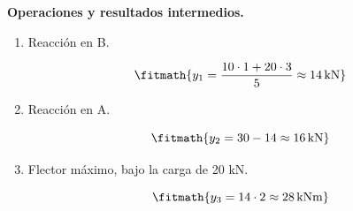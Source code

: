 \noindent\textbf{Operaciones y resultados intermedios.}

\begin{enumerate}

\item Reacción en B.

\[\fitmath{y_{1}=\frac{10\cdot 1+20\cdot 3}{5}\approx 14\,\mathrm{kN}}\]

\item Reacción en A.

\[\fitmath{y_{2}=30-14\approx 16\,\mathrm{kN}}\]

\item Flector máximo, bajo la carga de 20 kN.

\[\fitmath{y_{3}=14\cdot 2\approx 28\,\mathrm{kN m}}\]

\end{enumerate}

